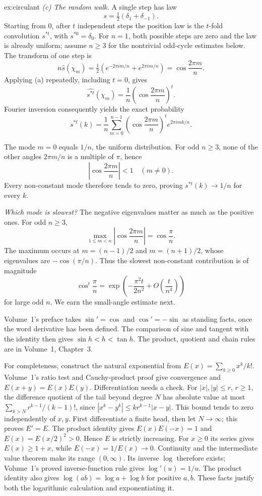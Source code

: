 \begin{solution}{ex:circulant}
\emph{(c) The random walk.} A single step has law
\[
s=\tfrac12(\delta_1+\delta_{-1}).
\]
Starting from $0$, after $t$ independent steps the position law is the $t$-fold convolution $s^{*t}$, with $s^{*0}=\delta_0$. For $n=1$, both possible steps are zero and the law is already uniform; assume $n\ge3$ for the nontrivial odd-cycle estimates below. The transform of one step is
\[
n\hat s(\chi_m)=\tfrac12(e^{-2\pi im/n}+e^{2\pi im/n})
=\cos\frac{2\pi m}{n}.
\]
Applying (a) repeatedly, including $t=0$, gives
\[
\boxed{\widehat{s^{*t}}(\chi_m)
=\frac1n\left(\cos\frac{2\pi m}{n}\right)^t}.
\]
Fourier inversion consequently yields the exact probability
\[
s^{*t}(k)=\frac1n\sum_{m=0}^{n-1}
\left(\cos\frac{2\pi m}{n}\right)^t
e^{2\pi i mk/n}.
\]

The mode $m=0$ equals $1/n$, the uniform distribution. For odd $n\ge3$, none of the other angles $2\pi m/n$ is a multiple of $\pi$, hence
\[
\left|\cos\frac{2\pi m}{n}\right|<1
\quad (m\ne0).
\]
Every non-constant mode therefore tends to zero, proving $s^{*t}(k)\to1/n$ for every $k$.

\emph{Which mode is slowest?} The negative eigenvalues matter as much as the positive ones. For odd $n\ge3$,
\[
\max_{1\le m<n}\left|\cos\frac{2\pi m}{n}\right|
=\cos\frac{\pi}{n}.
\]
The maximum occurs at $m=(n-1)/2$ and $m=(n+1)/2$, whose eigenvalues are $-\cos(\pi/n)$. Thus the slowest non-constant contribution is of magnitude
\[
\cos^t\frac{\pi}{n}
=\exp\!\left(-\frac{\pi^2t}{2n^2}
+O\!\left(\frac{t}{n^4}\right)\right)
\]
for large odd $n$. We earn the small-angle estimate next.

Volume~1's preface takes $\sin'=\cos$ and $\cos'=-\sin$ as standing facts, once the word derivative has been defined. The comparison of sine and tangent with the identity then gives $\sin h<h<\tan h$. The product, quotient and chain rules are in Volume~1, Chapter~3.

For completeness, construct the natural exponential from
$E(x)=\sum_{k\ge0}x^k/k!$. Volume~1's ratio test and Cauchy-product proof
give convergence and $E(x+y)=E(x)E(y)$. Differentiation needs a check.
For $|x|,|y|\le r$, $r\ge1$, the difference quotient of the tail beyond
degree $N$ has absolute value at most
$\sum_{k>N}r^{k-1}/(k-1)!$, since
$|x^k-y^k|\le k r^{k-1}|x-y|$. This bound tends to zero independently of
$x,y$. First differentiate a finite head, then let $N\to\infty$; this proves
$E'=E$. The product identity gives $E(x)E(-x)=1$ and
$E(x)=E(x/2)^2>0$. Hence $E$ is strictly increasing. For $x\ge0$ its series
gives $E(x)\ge1+x$, while $E(-x)=1/E(x)\to0$.
Continuity and the intermediate value theorem make its range $(0,\infty)$.
Its inverse $\log$ therefore exists; Volume~1's proved inverse-function rule
gives $\log'(u)=1/u$. The product identity also gives
$\log(ab)=\log a+\log b$ for positive $a,b$. These facts justify both
the logarithmic calculation and exponentiating it.


\end{solution}
